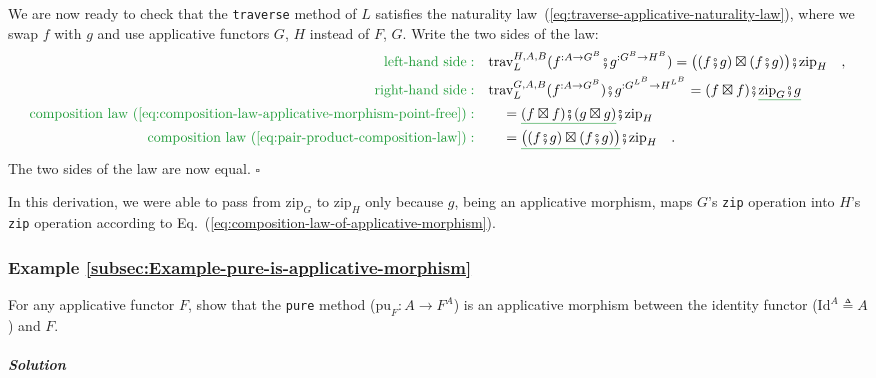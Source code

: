 We are now ready to check that the \lstinline!traverse! method of
$L$ satisfies the naturality law~(\ref{eq:traverse-applicative-naturality-law}),
where we swap $f$ with $g$ and use applicative functors $G$, $H$
instead of $F$, $G$. Write the two sides of the law:
\begin{align*}
{\color{greenunder}\text{left-hand side}:}\quad & \text{trav}_{L}^{H,A,B}(f^{:A\rightarrow G^{B}}\bef g^{:G^{B}\rightarrow H^{B}})=\big((f\bef g)\boxtimes(f\bef g)\big)\bef\text{zip}_{H}\quad,\\
{\color{greenunder}\text{right-hand side}:}\quad & \text{trav}_{L}^{G,A,B}(f^{:A\rightarrow G^{B}})\bef g^{:G^{L^{B}}\rightarrow H^{L^{B}}}=(f\boxtimes f)\bef\gunderline{\text{zip}_{G}\bef g}\\
{\color{greenunder}\text{composition law~(\ref{eq:composition-law-applicative-morphism-point-free})}:}\quad & \quad=\gunderline{(f\boxtimes f)\bef(g\boxtimes g)}\bef\text{zip}_{H}\\
{\color{greenunder}\text{composition law~(\ref{eq:pair-product-composition-law})}:}\quad & \quad=\gunderline{\big((f\bef g)\boxtimes(f\bef g)\big)}\bef\text{zip}_{H}\quad.
\end{align*}
The two sides of the law are now equal. $\square$

In this derivation, we were able to pass from $\text{zip}_{G}$ to
$\text{zip}_{H}$ only because $g$, being an applicative morphism,
maps $G$\textsf{'}s \lstinline!zip! operation into $H$\textsf{'}s \lstinline!zip!
operation according to Eq.~(\ref{eq:composition-law-of-applicative-morphism}).

\subsubsection{Example \label{subsec:Example-pure-is-applicative-morphism}\ref{subsec:Example-pure-is-applicative-morphism}}

For any applicative functor $F$, show that the \lstinline!pure!
method ($\text{pu}_{F}:A\rightarrow F^{A}$) is an applicative morphism
between the identity functor ($\text{Id}^{A}\triangleq A$) and $F$.

\subparagraph{Solution}

